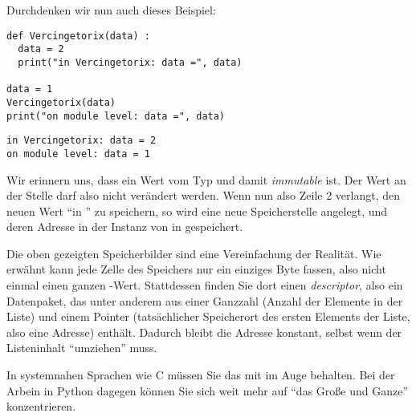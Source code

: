 \begin{tcolorbox}[title=Speicherbild]
\begin{center}
\end{center}
\end{tcolorbox}


Durchdenken wir nun auch dieses Beispiel:
\begin{codebox}
\begin{verbatim}
def Vercingetorix(data) :
  data = 2
  print("in Vercingetorix: data =", data)

data = 1
Vercingetorix(data)
print("on module level: data =", data)
\end{verbatim}
\end{codebox}

\begin{cmdbox}
\begin{verbatim}
in Vercingetorix: data = 2
on module level: data = 1
\end{verbatim}
\end{cmdbox}

Wir erinnern uns, dass  ein Wert vom Typ  und damit \emph{immutable} ist. Der Wert an der Stelle  darf also nicht verändert werden. Wenn nun also Zeile 2 verlangt, den neuen Wert  \enquote{in } zu speichern, so wird eine neue Speicherstelle angelegt, und deren Adresse in der Instanz von  in  gespeichert.

\begin{hintbox}
Die oben gezeigten Speicherbilder sind eine Vereinfachung der Realität. Wie erwähnt kann jede Zelle des Speichers nur ein einziges Byte fassen, also nicht einmal einen ganzen -Wert. Stattdessen finden Sie dort einen \emph{descriptor}, also ein Datenpaket, das unter anderem aus einer Ganzzahl (Anzahl der Elemente in der Liste) und einem Pointer (tatsächlicher Speicherort des ersten Elements der Liste, also eine Adresse) enthält. Dadurch bleibt die Adresse  konstant, selbst wenn der Listeninhalt \enquote{umziehen} muss.

In systemnahen Sprachen wie C müssen Sie das mit im Auge behalten. Bei der Arbein in Python dagegen können Sie sich weit mehr auf \enquote{das Große und Ganze} konzentrieren.
\end{hintbox}

